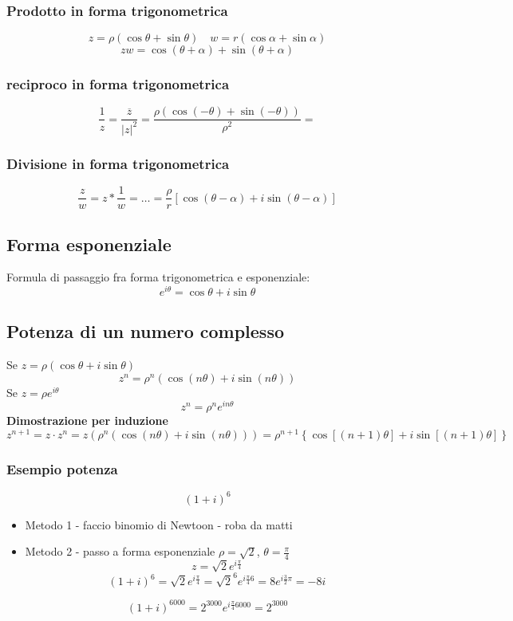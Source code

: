 \subsubsection{Prodotto in forma trigonometrica}
\[
	z = \rho\left( \cos \theta + \sin \theta \right) \quad w = r \left( \cos \alpha + \sin \alpha \right)
\]
\[
	z w = \cos\left( \theta + \alpha \right) + \sin \left(  \theta + \alpha \right)
\]
\subsubsection{reciproco in forma trigonometrica}
\[
	\frac{1}{z} = \frac{\overline{z}}{\left|z\right|^2} = \frac{\rho \left( \cos \left( -\theta \right) + \sin \left( -\theta \right)  \right) }{\rho ^2}=
\]

\subsubsection{Divisione in forma trigonometrica}
\[
	\frac{z}{w} = z * \frac{1}{w} = \ldots = \frac{\rho}{r}\left[ \cos\left( \theta - \alpha \right) + i \sin \left( \theta - \alpha \right)  \right]
\]
\subsection{Forma esponenziale}
Formula di passaggio fra forma trigonometrica e esponenziale:
\[
	e ^{ i \theta} = \cos \theta + i \sin \theta
\]
\subsection{Potenza di un numero complesso}
Se $z = \rho \left(  \cos \theta + i \sin \theta \right) $
\[
	z^{n} = \rho ^{n} \left( \cos \left( n \theta \right)  + i \sin \left( n \theta \right)  \right)
\]
Se $z = \rho e^{ i \theta}$
\[
	z^{n} = \rho ^{n} e ^{ i n \theta}
\]
\textbf{Dimostrazione per induzione}
\[
	z^{n+1} = z \cdot z^{n} = z \left( \rho ^{n} \left( \cos \left( n \theta \right)  + i \sin \left( n \theta \right)  \right)  \right)  = \rho ^{ n+1 } \left\{\cos \left[  \left( n+1 \right)  \theta \right] + i \sin \left[  \left( n+1 \right)  \theta \right]  \right\}
\]
\subsubsection{Esempio potenza}
\[
	\left( 1 + i  \right) ^{6}
\]
\begin{itemize}
	\item Metodo 1 - faccio binomio di Newtoon - roba da matti
	\item Metodo 2 - passo a forma esponenziale $\rho = \sqrt{2} $, $\theta = \frac{\pi}{4}$ \[
		      z = \sqrt{2} e^{i \frac{\pi}{4}}
	      \]
	      \[
		      \left( 1 + i \right) ^{ 6} = \sqrt{2} e ^{ i \frac{\pi}{4}} = \sqrt{2} ^{6} e ^{ i \frac{\pi}{4}6} = 8 e ^{i \frac{3}{2} \pi} = -8 i
	      \]
\end{itemize}
\[
	\left( 1 + i \right) ^{ 6000}= 2^{3000} e ^{i \frac{\pi}{4}6000} = 2^{3000}
\]
